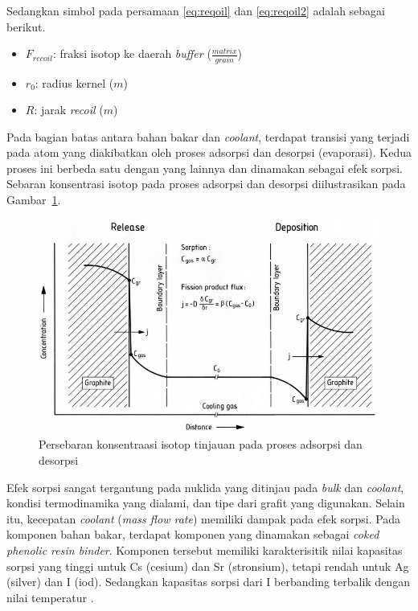 \documentclass[a4paper,11pt]{report}
\renewcommand{\figurename}{Gambar}
\begin{document}
Sedangkan simbol pada persamaan \ref{eq:reqoil} dan \ref{eq:reqoil2} adalah sebagai berikut.
\begin{itemize}
  \item $F_{recoil}$: fraksi isotop ke daerah \textit{buffer} ($\frac{matrix}{grain}$)
  \item $r_0$: radius kernel ($m$)
  \item $R$: jarak \textit{recoil} ($m$)
\end{itemize}

Pada bagian batas antara bahan bakar dan \textit{coolant}, terdapat transisi yang terjadi pada atom yang diakibatkan oleh proses adsorpsi dan desorpsi (evaporasi). Kedua proses ini berbeda satu dengan yang lainnya dan dinamakan sebagai efek sorpsi. Sebaran konsentrasi isotop pada proses adsorpsi dan desorpsi diilustrasikan pada \figurename~\ref{fig:efeksorpsi}.

\begin{figure}
  \begin{center}
    \includegraphics[scale=.35]{pics/efeksorpsi.png}
    \caption{Persebaran konsentraasi isotop tinjauan pada proses adsorpsi dan desorpsi \cite{report2}}
    \label{fig:efeksorpsi}
  \end{center}
\end{figure}

Efek sorpsi sangat tergantung pada nuklida yang ditinjau pada \textit{bulk} dan \textit{coolant}, kondisi termodinamika yang dialami, dan tipe dari grafit yang digunakan. Selain itu, kecepatan \textit{coolant} (\textit{mass flow rate}) memiliki dampak pada efek sorpsi. Pada komponen bahan bakar, terdapat komponen yang dinamakan sebagai \textit{coked phenolic resin binder}. Komponen tersebut memiliki karakterisitik nilai kapasitas sorpsi yang tinggi untuk Cs (cesium) dan Sr (stronsium), tetapi rendah untuk Ag (silver) dan I (iod). Sedangkan kapasitas sorpsi dari I berbanding terbalik dengan nilai temperatur \cite{report3}.
\end{document}

